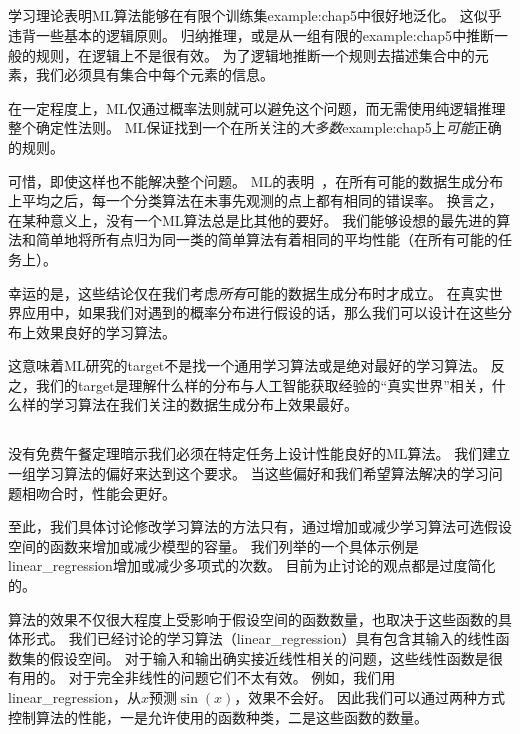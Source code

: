 \subsection{}
\label{sec:the_no_free_lunch_theorem}
学习理论表明\gls{ML}算法能够在有限个训练集\gls{example:chap5}中很好地泛化。
这似乎违背一些基本的逻辑原则。
归纳推理，或是从一组有限的\gls{example:chap5}中推断一般的规则，在逻辑上不是很有效。
为了逻辑地推断一个规则去描述集合中的元素，我们必须具有集合中每个元素的信息。

在一定程度上，\gls{ML}仅通过概率法则就可以避免这个问题，而无需使用纯逻辑推理整个确定性法则。
\gls{ML}保证找到一个在所关注的\emph{大多数}\gls{example:chap5}上\emph{可能}正确的规则。

可惜，即使这样也不能解决整个问题。
\gls{ML}的表明~\citep{Wolpert-1996}，在所有可能的数据生成分布上平均之后，每一个分类算法在未事先观测的点上都有相同的错误率。
换言之，在某种意义上，没有一个\gls{ML}算法总是比其他的要好。
我们能够设想的最先进的算法和简单地将所有点归为同一类的简单算法有着相同的平均性能（在所有可能的任务上）。


幸运的是，这些结论仅在我们考虑\emph{所有}可能的数据生成分布时才成立。
在真实世界应用中，如果我们对遇到的概率分布进行假设的话，那么我们可以设计在这些分布上效果良好的学习算法。

这意味着\gls{ML}研究的\gls{target}不是找一个通用学习算法或是绝对最好的学习算法。
反之，我们的\gls{target}是理解什么样的分布与人工智能获取经验的``真实世界''相关，什么样的学习算法在我们关注的数据生成分布上效果最好。

\subsection{}
\label{sec:regularization}
没有免费午餐定理暗示我们必须在特定任务上设计性能良好的\gls{ML}算法。
我们建立一组学习算法的偏好来达到这个要求。
当这些偏好和我们希望算法解决的学习问题相吻合时，性能会更好。

至此，我们具体讨论修改学习算法的方法只有，通过增加或减少学习算法可选假设空间的函数来增加或减少模型的容量。
我们列举的一个具体示例是\gls{linear_regression}增加或减少多项式的次数。
目前为止讨论的观点都是过度简化的。

算法的效果不仅很大程度上受影响于假设空间的函数数量，也取决于这些函数的具体形式。
我们已经讨论的学习算法（\gls{linear_regression}）具有包含其输入的线性函数集的假设空间。
对于输入和输出确实接近线性相关的问题，这些线性函数是很有用的。
对于完全非线性的问题它们不太有效。
例如，我们用\gls{linear_regression}，从$x$预测$\sin(x)$，效果不会好。
因此我们可以通过两种方式控制算法的性能，一是允许使用的函数种类，二是这些函数的数量。

